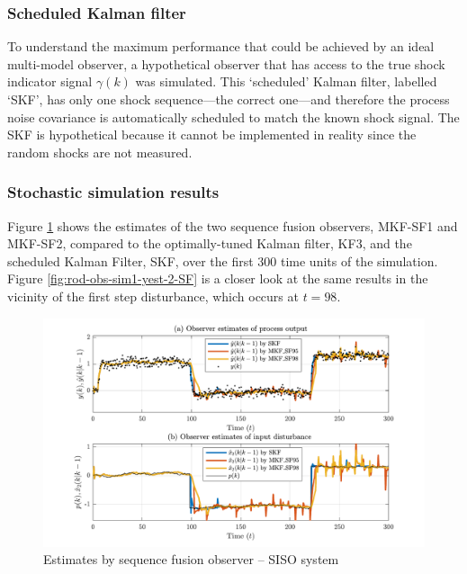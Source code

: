 \subsubsection{Scheduled Kalman filter} \label{sim-obs-lin-1-SKF}

To understand the maximum performance that could be achieved by an ideal multi-model observer, a hypothetical observer that has access to the true shock indicator signal $\gamma(k)$ was simulated. This `scheduled' Kalman filter, labelled ‘SKF’, has only one shock sequence---the correct one---and therefore the process noise covariance is automatically scheduled to match the known shock signal. The SKF is hypothetical because it cannot be implemented in reality since the random shocks are not measured.

\subsubsection{Stochastic simulation results} \label{sim-obs-lin-1-results}

Figure \ref{fig:rod-obs-sim1-yest-1-SF} shows the estimates of the two sequence fusion observers, MKF-SF1 and MKF-SF2, compared to the optimally-tuned Kalman filter, KF3, and the scheduled Kalman Filter, SKF, over the first 300 time units of the simulation. Figure \ref{fig:rod-obs-sim1-yest-2-SF} is a closer look at the same results in the vicinity of the first step disturbance, which occurs at $t=98$.
\begin{figure}[htp]
	\centering
	\includegraphics[width=13cm]{images/rod_obs_sim1_all_seed_y_est1_SF95_SF98.pdf}
	\caption{Estimates by sequence fusion observer – SISO system}
	\label{fig:rod-obs-sim1-yest-1-SF}
\end{figure}


